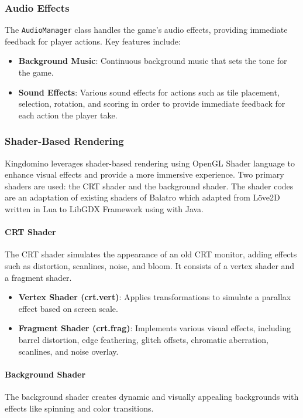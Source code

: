 \documentclass[conference]{IEEEtran}
\begin{document}
\subsubsection{Audio Effects}
The \texttt{AudioManager} class handles the game's audio effects, providing
immediate feedback for player actions. Key features include:
\begin{itemize}
    \item \textbf{Background Music}: Continuous background music that sets the tone for the game.
    \item \textbf{Sound Effects}: Various sound effects for actions such as tile placement, selection, rotation, and scoring in order to provide immediate feedback for each action the player take.
\end{itemize}

\subsubsection{Shader-Based Rendering}
Kingdomino leverages shader-based rendering using OpenGL Shader language to
enhance visual effects and provide a more immersive experience. Two primary
shaders are used: the CRT shader and the background shader. The shader codes
are an adaptation of existing shaders of Balatro\cite{wiki:balatro} which
adapted from Löve2D written in Lua to LibGDX Framework using with Java.

\paragraph{CRT Shader}
The CRT shader simulates the appearance of an old CRT monitor, adding effects
such as distortion, scanlines, noise, and bloom. It consists of a vertex shader
and a fragment shader.

\begin{itemize}
    \item \textbf{Vertex Shader (crt.vert)}: Applies transformations to simulate a parallax effect based on screen scale.
    \item \textbf{Fragment Shader (crt.frag)}: Implements various visual effects, including barrel distortion, edge feathering, glitch offsets, chromatic aberration, scanlines, and noise overlay.
\end{itemize}

\paragraph{Background Shader}
The background shader creates dynamic and visually appealing backgrounds with
effects like spinning and color transitions.
\end{document}
